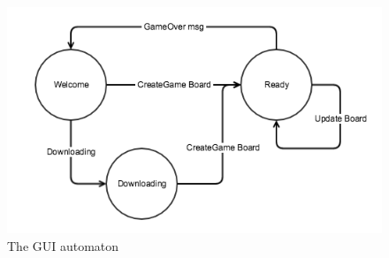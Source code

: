 \documentclass[12pt]{article}
\begin{document}
\begin{figure}[ht]
\begin{center}
\includegraphics[scale=.65]{img/gui_state_machine_nim.png}
\caption{The GUI automaton}
\end{center}
\label{fig:automaton}
\end{figure}
\end{document}
